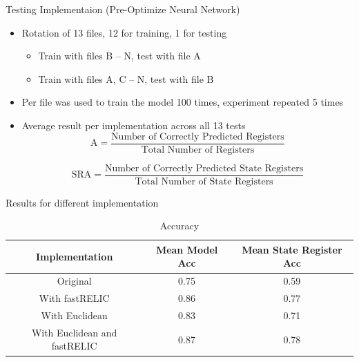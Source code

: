 \documentclass[aspectratio=169]{beamer}
\begin{document}
\begin{frame}{Testing Implementaion (Pre-Optimize Neural Network)}
\begin{itemize}
	\item Rotation of 13 files, 12 for training, 1 for testing
		\begin{itemize}
			\item Train with files B -- N, test with file A
			\item Train with files A, C -- N, test with file B
		\end{itemize}
	\item Per file was used to train the model 100 times, experiment repeated 5 times
	\item Average result per implementation across all 13 tests
       \begin{equation*}
           \label{eqn:model accuracy equation}
           \text{A}= \frac{\text{Number of Correctly Predicted Registers}}{\text{Total Number of Registers}}
       \end{equation*}

       \begin{equation*}
       \label{eqn:state register prediction accuracy equation}
       \text{SRA}= \frac{\text{Number of Correctly Predicted State Registers}}{\text{Total Number of State Registers}}
       \end{equation*}
\end{itemize}
\end{frame}

\begin{frame}{Results for different implementation}
\centering
\begin{table}
	\begin{tabular}{|c|c|c|}
		\hline
		Implementation & Mean Model Acc & Mean State Register Acc \\
		\hline
		\hline
		Original & 0.75 & 0.59\\
		\hline
		With fastRELIC & 0.86 & 0.77\\
		\hline
		With Euclidean & 0.83 & 0.71\\
		\hline
		With Euclidean and fastRELIC & 0.87 & 0.78\\
		\hline
	\end{tabular}
	\caption{Accuracy}
	\label{tab:Accuracy No Feature Selection}
\end{table}
\end{frame}
\end{document}
